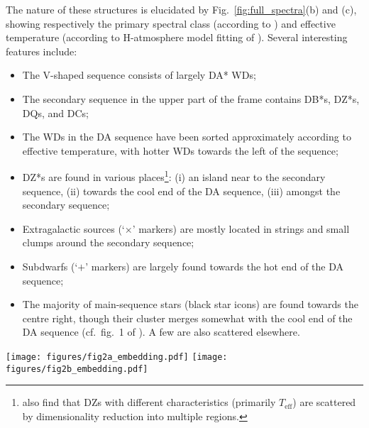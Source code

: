 \documentclass[fleqn,usenatbib]{mnras}
\def\Teff{T_\mathrm{eff}}
\begin{document}
The nature of these structures is elucidated by Fig.~\ref{fig:full_spectra}(b) and (c), showing respectively the primary spectral class (according to \citealt{manser24}) and effective temperature (according to H-atmosphere model fitting of \citealt{gentilefusillo19}).
Several interesting features include:
\begin{itemize}
\item
The V-shaped sequence consists of largely DA* WDs;
\item
The secondary sequence in the upper part of the frame contains DB*s, DZ*s, DQs, and DCs;
\item
The WDs in the DA sequence have been sorted approximately according to effective temperature, with hotter WDs towards the left of the sequence;
\item
DZ*s are found in various places\footnote{
    \citet{kao24} also find that DZs with different characteristics (primarily $\Teff$) are scattered by dimensionality reduction into multiple regions.
}: (i) an island near to the secondary sequence, (ii) towards the cool end of the DA sequence, (iii) amongst the secondary sequence;
\item
Extragalactic sources (`$\times$' markers) are mostly located in strings and small clumps around the secondary sequence;
\item 
Subdwarfs (`$+$' markers) are largely found towards the hot end of the DA sequence;
\item
The majority of main-sequence stars (black star icons) are found towards the centre right, though their cluster merges somewhat with the cool end of the DA sequence (cf.\ fig.~1 of \citealt{eisenstein06}).
A few are also scattered elsewhere.
\end{itemize}

\begin{figure*}
    \centering
\texttt{[image: figures/fig2a\_embedding.pdf]}
\texttt{[image: figures/fig2b\_embedding.pdf]}
\caption{
    (a) $t$SNE embedding of DESI EDR WD candidate spectra.
    The embedding aims to reflect the pairwise distances between the high-dimensional spectra in a two-dimensional space; as such the axes are arbitrary.
    (b) The embedding is colour-coded according to the visual spectral classification of \citet{manser24}.
    For WDs, the colour corresponds to primary spectral type: DA*s (inc.\ DAZs, etc.) in red; DB*s in blue, and so on.
    Other sources not corresponding to individual WDs have different symbols (see key).
    The main feature of the embedding is the sequence of DA*s (red), though several other clusters are clear (see text).
    (c) The embedding is colour-coded by effective temperature, according to the hydrogen-atmosphere WD model which best fits the sources' Gaia photometry \citep{gentilefusillo19}.
    The DA sequence extends from hotter WDs on the left (among which lies the singular DO), around to cooler WDs at the top right.
    Note that objects with a low probability of being a WD ($P_\mathrm{WD} < 0.75$; see \citealt{gentilefusillo15}) are not assigned a temperature \citep{gentilefusillo19}.
}
\label{fig:full_spectra}
\end{figure*}
\end{document}

